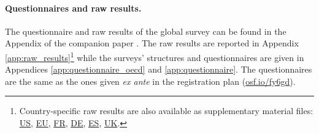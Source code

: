 \begin{small}
\paragraph{\small Questionnaires and raw results.} %
The questionnaire and raw results of the global survey can be found in the Appendix of the companion paper \citep{dechezlepretre_fighting_2022}. %
The raw results are reported in Appendix \ref{app:raw_results}\footnote{Country-specific raw results are also available as supplementary material files:  \href{https://github.com/bixiou/global_tax_attitudes/raw/main/paper/app_desc_stats_US.pdf}{US}, \href{https://github.com/bixiou/global_tax_attitudes/raw/main/paper/app_desc_stats_EU.pdf}{EU}, \href{https://github.com/bixiou/global_tax_attitudes/raw/main/paper/app_desc_stats_FR.pdf}{FR}, \href{https://github.com/bixiou/global_tax_attitudes/raw/main/paper/app_desc_stats_DE.pdf}{DE}, \href{https://github.com/bixiou/global_tax_attitudes/raw/main/paper/app_desc_stats_ES.pdf}{ES}, \href{https://github.com/bixiou/global_tax_attitudes/raw/main/paper/app_desc_stats_UK.pdf}{UK}.} while the surveys' structures and questionnaires are given in Appendices \ref{app:questionnaire_oecd} and \ref{app:questionnaire}. The questionnaires are the same as the ones given \textit{ex ante} in the registration plan (\href{https://osf.io/fy6gd}{osf.io/fy6gd}).


\end{small}
